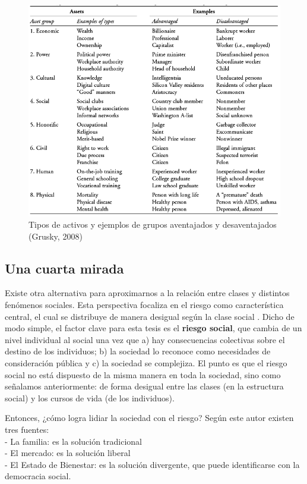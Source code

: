 \documentclass[
]{book}
\begin{document}
\begin{figure}

{\centering \includegraphics[width=0.8\linewidth]{imagenes/grusky} 

}

\caption{Tipos de activos y ejemplos de grupos aventajados y desaventajados (Grusky, 2008)}\label{fig:unnamed-chunk-84}
\end{figure}

\hypertarget{una-cuarta-mirada}{%
\subsection{Una cuarta mirada}\label{una-cuarta-mirada}}

Existe otra alternativa para aproximarnos a la relación entre clases y distintos fenómenos sociales. Esta perspectiva focaliza en el riesgo como característica central, el cual se distribuye de manera desigual según la clase social \citep{Esping-Andersen2000}. Dicho de modo simple, el factor clave para esta tesis es el \textbf{riesgo social}, que cambia de un nivel individual al social una vez que a) hay consecuencias colectivas sobre el destino de los individuos; b) la sociedad lo reconoce como necesidades de consideración pública y c) la sociedad se complejiza. El punto es que el riesgo social no está dispuesto de la misma manera en toda la sociedad, sino como señalamos anteriormente: de forma desigual entre las clases (en la estructura social) y los cursos de vida (de los individuos).

Entonces, ¿cómo logra lidiar la sociedad con el riesgo? Según este autor existen tres fuentes:\\
- La familia: es la solución tradicional\\
- El mercado: es la solución liberal\\
- El Estado de Bienestar: es la solución divergente, que puede identificarse con la democracia social.
\end{document}
